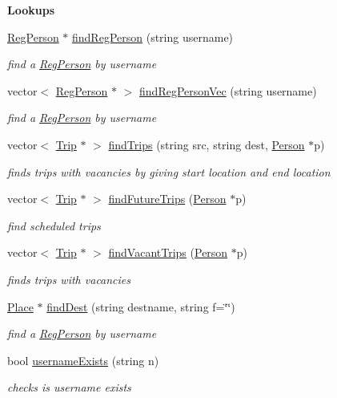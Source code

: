 \begin{Indent}{\bf Lookups}\par
\begin{DoxyCompactItemize}
\item 
\hyperlink{class_reg_person}{Reg\+Person} $\ast$ \hyperlink{class_logic_a0ecfaa0682e8f25903808ffd573f57bf}{find\+Reg\+Person} (string username)
\begin{DoxyCompactList}\small\item\em find a \hyperlink{class_reg_person}{Reg\+Person} by username \end{DoxyCompactList}\item 
vector$<$ \hyperlink{class_reg_person}{Reg\+Person} $\ast$ $>$ \hyperlink{class_logic_af68bcaf14c12304f97b69948d99a28c6}{find\+Reg\+Person\+Vec} (string username)
\begin{DoxyCompactList}\small\item\em find a \hyperlink{class_reg_person}{Reg\+Person} by username \end{DoxyCompactList}\item 
vector$<$ \hyperlink{class_trip}{Trip} $\ast$ $>$ \hyperlink{class_logic_adbeb6ad7da6ceb43a5449e66e822c2f6}{find\+Trips} (string src, string dest, \hyperlink{class_person}{Person} $\ast$p)
\begin{DoxyCompactList}\small\item\em finds trips with vacancies by giving start location and end location \end{DoxyCompactList}\item 
vector$<$ \hyperlink{class_trip}{Trip} $\ast$ $>$ \hyperlink{class_logic_afa015531387fb891159d98181812f14e}{find\+Future\+Trips} (\hyperlink{class_person}{Person} $\ast$p)
\begin{DoxyCompactList}\small\item\em find scheduled trips \end{DoxyCompactList}\item 
vector$<$ \hyperlink{class_trip}{Trip} $\ast$ $>$ \hyperlink{class_logic_ab8d6c8b52e668d84d1ba1f950608dc20}{find\+Vacant\+Trips} (\hyperlink{class_person}{Person} $\ast$p)
\begin{DoxyCompactList}\small\item\em finds trips with vacancies \end{DoxyCompactList}\item 
\hyperlink{class_place}{Place} $\ast$ \hyperlink{class_logic_ab4f100d8430cf4bd57dee36a7df83870}{find\+Dest} (string destname, string f=\char`\"{}\char`\"{})
\begin{DoxyCompactList}\small\item\em find a \hyperlink{class_reg_person}{Reg\+Person} by username \end{DoxyCompactList}\item 
bool \hyperlink{class_logic_a7d80debeadfc549257e632523be1916a}{username\+Exists} (string n)
\begin{DoxyCompactList}\small\item\em checks is username exists \end{DoxyCompactList}\end{DoxyCompactItemize}
\end{Indent}
